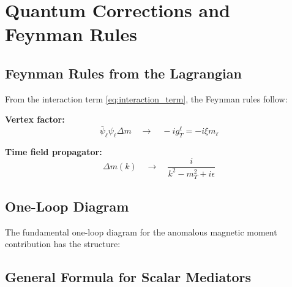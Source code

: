 	\section{Quantum Corrections and Feynman Rules}
	
	\subsection{Feynman Rules from the Lagrangian}
	
	From the interaction term \eqref{eq:interaction_term}, the Feynman rules follow:
	
	\textbf{Vertex factor:}
	\begin{equation}
		\bar{\psi}_\ell \psi_\ell \Delta m \quad \longrightarrow \quad -i g_T^\ell = -i \xi m_\ell
		\label{eq:vertex_factor}
	\end{equation}
	
	\textbf{Time field propagator:}
	\begin{equation}
		\Delta m(k) \quad \longrightarrow \quad \frac{i}{k^2 - m_T^2 + i\epsilon}
		\label{eq:propagator}
	\end{equation}
	
	\subsection{One-Loop Diagram}
	
	The fundamental one-loop diagram for the anomalous magnetic moment contribution has the structure:
\begin{center}
\end{center}


	
	\subsection{General Formula for Scalar Mediators}
	
